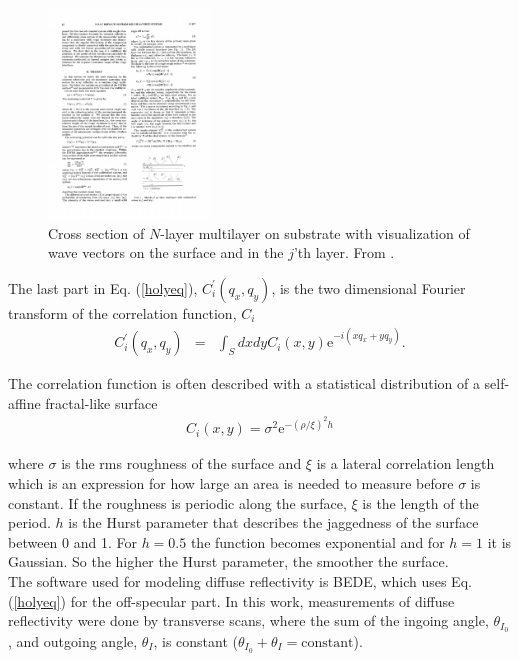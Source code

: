 \begin{figure}[!ht] %
	\centering
		\includegraphics[height=2.2in]{figures/xray_app/holykvector.pdf}
	\caption{Cross section of $N$-layer multilayer on substrate with visualization of wave vectors on the surface and in the $j$'th layer. From \cite{Holy:1993p5469}.}
	\label{fig:holykvector}
\end{figure}

The last part in Eq. (\ref{holyeq}), $C_i^{'} (q_x,q_y)$, is the two dimensional Fourier transform of the correlation function, $C_i$
\begin{eqnarray}
	C_i^{'} (q_x,q_y) &=& \int_S dxdy C_i(x,y)\mathrm{e}^{-i(xq_x +yq_y)}.
\end{eqnarray}

The correlation function is often described with a statistical distribution of a self-affine fractal-like surface\cite{Sinha:1988p5102}
\begin{eqnarray}
	C_i (x,y) = \sigma^2 \mathrm{e}^{-(\rho/\xi)^2h}
\end{eqnarray}

where $\sigma$ is the rms roughness of the surface and $\xi$ is a lateral correlation length which is an expression for how large an area is needed to measure before $\sigma$ is constant. If the roughness is periodic along the surface, $\xi$ is the length of the period. $h$ is the Hurst parameter that describes the jaggedness of the surface between 0 and 1. For $h=0.5$ the function becomes exponential and for $h=1$ it is Gaussian. So the higher the Hurst parameter, the smoother the surface.\\

The software used for modeling diffuse reflectivity is BEDE\cite{Wormington:1992p5128}, which uses Eq. (\ref{holyeq}) for the off-specular part. In this work, measurements of diffuse reflectivity were done by transverse scans, where the sum of the ingoing angle, $\theta_{I_0}$, and outgoing angle, $\theta_I$, is constant ($\theta_{I_0} + \theta_I=\mathrm{constant}$). \\

